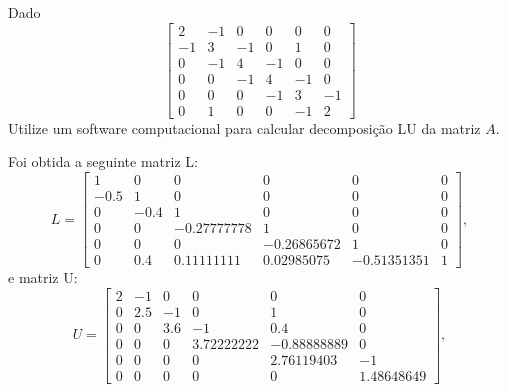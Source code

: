 \begin{question}
  Dado
  \begin{equation}
    \begin{bmatrix}
      2  & -1 & 0  & 0  & 0  & 0  \\
      -1 & 3  & -1 & 0  & 1  & 0  \\
      0  & -1 & 4  & -1 & 0  & 0  \\
      0  & 0  & -1 & 4  & -1 & 0  \\
      0  & 0  & 0  & -1 & 3  & -1 \\
      0  & 1  & 0  & 0  & -1 & 2
    \end{bmatrix}
  \end{equation}
  \vspace{8pt}
  Utilize um software computacional para calcular decomposição LU da matriz $A$.
\end{question}

\begin{resolution}
  Foi obtida a seguinte matriz L:
  \begin{equation}
    L = \begin{bmatrix}
      1    & 0    & 0           & 0           & 0           & 0 \\
      -0.5 & 1    & 0           & 0           & 0           & 0 \\
      0    & -0.4 & 1           & 0           & 0           & 0 \\
      0    & 0    & -0.27777778 & 1           & 0           & 0 \\
      0    & 0    & 0           & -0.26865672 & 1           & 0 \\
      0    & 0.4  & 0.11111111  & 0.02985075  & -0.51351351 & 1
    \end{bmatrix},
  \end{equation}
  e matriz U:
  \begin{equation}
    U = \begin{bmatrix}
      2 & -1  & 0   & 0          & 0           & 0          \\
      0 & 2.5 & -1  & 0          & 1           & 0          \\
      0 & 0   & 3.6 & -1         & 0.4         & 0          \\
      0 & 0   & 0   & 3.72222222 & -0.88888889 & 0          \\
      0 & 0   & 0   & 0          & 2.76119403  & -1         \\
      0 & 0   & 0   & 0          & 0           & 1.48648649
    \end{bmatrix},
  \end{equation}
\end{resolution}


